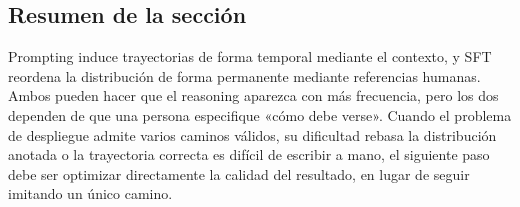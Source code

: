 \subsection{Resumen de la sección}

Prompting induce trayectorias de forma temporal mediante el contexto, y SFT reordena la distribución de forma permanente mediante referencias humanas. Ambos pueden hacer que el reasoning aparezca con más frecuencia, pero los dos dependen de que una persona especifique «cómo debe verse». Cuando el problema de despliegue admite varios caminos válidos, su dificultad rebasa la distribución anotada o la trayectoria correcta es difícil de escribir a mano, el siguiente paso debe ser optimizar directamente la calidad del resultado, en lugar de seguir imitando un único camino.
